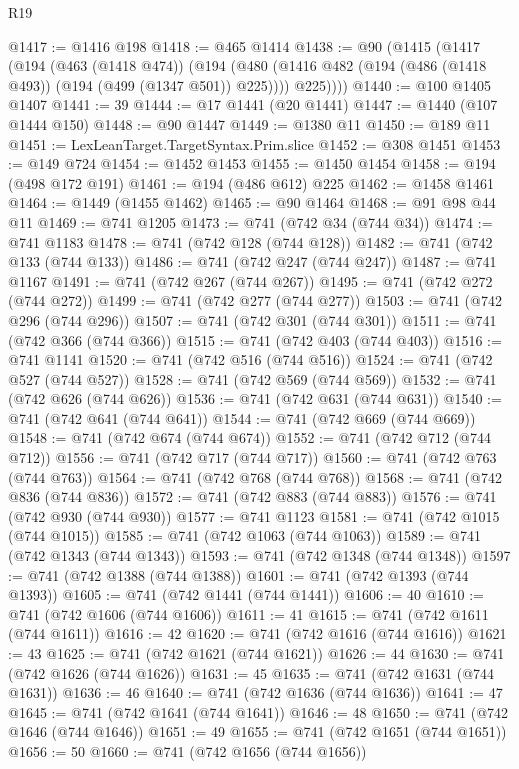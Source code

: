 \begin{lexlean}{R19}
\begin{coremodule}
@1417 := @1416 @198
@1418 := @465 @1414
@1438 := @90
    (@1415
      (@1417
        (@194
          (@463 (@1418 @474))
          (@194
            (@480 (@1416 @482 (@194 (@486 (@1418 @493)) (@194 (@499 (@1347 @501)) @225))))
            @225))))
@1440 := @100 @1405 @1407
@1441 := 39
@1444 := @17 @1441 (@20 @1441)
@1447 := @1440 (@107 @1444 @150)
@1448 := @90 @1447
@1449 := @1380 @11
@1450 := @189 @11
@1451 := LexLeanTarget.TargetSyntax.Prim.slice
@1452 := @308 @1451
@1453 := @149 @724
@1454 := @1452 @1453
@1455 := @1450 @1454
@1458 := @194 (@498 @172 @191)
@1461 := @194 (@486 @612) @225
@1462 := @1458 @1461
@1464 := @1449 (@1455 @1462)
@1465 := @90 @1464
@1468 := @91 @98 @44 @11
@1469 := @741 @1205
@1473 := @741 (@742 @34 (@744 @34))
@1474 := @741 @1183
@1478 := @741 (@742 @128 (@744 @128))
@1482 := @741 (@742 @133 (@744 @133))
@1486 := @741 (@742 @247 (@744 @247))
@1487 := @741 @1167
@1491 := @741 (@742 @267 (@744 @267))
@1495 := @741 (@742 @272 (@744 @272))
@1499 := @741 (@742 @277 (@744 @277))
@1503 := @741 (@742 @296 (@744 @296))
@1507 := @741 (@742 @301 (@744 @301))
@1511 := @741 (@742 @366 (@744 @366))
@1515 := @741 (@742 @403 (@744 @403))
@1516 := @741 @1141
@1520 := @741 (@742 @516 (@744 @516))
@1524 := @741 (@742 @527 (@744 @527))
@1528 := @741 (@742 @569 (@744 @569))
@1532 := @741 (@742 @626 (@744 @626))
@1536 := @741 (@742 @631 (@744 @631))
@1540 := @741 (@742 @641 (@744 @641))
@1544 := @741 (@742 @669 (@744 @669))
@1548 := @741 (@742 @674 (@744 @674))
@1552 := @741 (@742 @712 (@744 @712))
@1556 := @741 (@742 @717 (@744 @717))
@1560 := @741 (@742 @763 (@744 @763))
@1564 := @741 (@742 @768 (@744 @768))
@1568 := @741 (@742 @836 (@744 @836))
@1572 := @741 (@742 @883 (@744 @883))
@1576 := @741 (@742 @930 (@744 @930))
@1577 := @741 @1123
@1581 := @741 (@742 @1015 (@744 @1015))
@1585 := @741 (@742 @1063 (@744 @1063))
@1589 := @741 (@742 @1343 (@744 @1343))
@1593 := @741 (@742 @1348 (@744 @1348))
@1597 := @741 (@742 @1388 (@744 @1388))
@1601 := @741 (@742 @1393 (@744 @1393))
@1605 := @741 (@742 @1441 (@744 @1441))
@1606 := 40
@1610 := @741 (@742 @1606 (@744 @1606))
@1611 := 41
@1615 := @741 (@742 @1611 (@744 @1611))
@1616 := 42
@1620 := @741 (@742 @1616 (@744 @1616))
@1621 := 43
@1625 := @741 (@742 @1621 (@744 @1621))
@1626 := 44
@1630 := @741 (@742 @1626 (@744 @1626))
@1631 := 45
@1635 := @741 (@742 @1631 (@744 @1631))
@1636 := 46
@1640 := @741 (@742 @1636 (@744 @1636))
@1641 := 47
@1645 := @741 (@742 @1641 (@744 @1641))
@1646 := 48
@1650 := @741 (@742 @1646 (@744 @1646))
@1651 := 49
@1655 := @741 (@742 @1651 (@744 @1651))
@1656 := 50
@1660 := @741 (@742 @1656 (@744 @1656))

\end{coremodule}
\end{lexlean}
